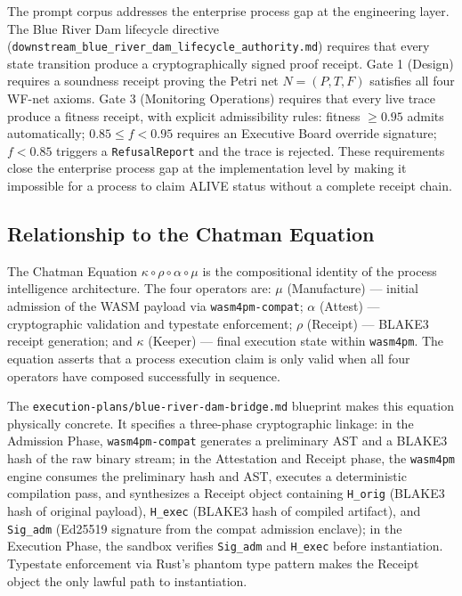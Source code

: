 The prompt corpus addresses the enterprise process gap at the engineering layer. The
Blue River Dam lifecycle directive (\texttt{downstream\_blue\_river\_dam\_lifecycle\_authority.md})
requires that every state transition produce a cryptographically signed proof receipt.
Gate 1 (Design) requires a soundness receipt proving the Petri net $N = (P, T, F)$
satisfies all four WF-net axioms. Gate 3 (Monitoring Operations) requires that every
live trace produce a fitness receipt, with explicit admissibility rules:
fitness $\geq 0.95$ admits automatically; $0.85 \leq f < 0.95$ requires an Executive
Board override signature; $f < 0.85$ triggers a \texttt{RefusalReport} and the trace
is rejected. These requirements close the enterprise process gap at the implementation
level by making it impossible for a process to claim ALIVE status without a complete
receipt chain.

\subsection{Relationship to the Chatman Equation}
\label{sec:prompts-lineage-chatman}

The Chatman Equation $\kappa \circ \rho \circ \alpha \circ \mu$ is the compositional
identity of the process intelligence architecture. The four operators are:
$\mu$ (Manufacture) --- initial admission of the WASM payload via
\texttt{wasm4pm-compat}; $\alpha$ (Attest) --- cryptographic validation and typestate
enforcement; $\rho$ (Receipt) --- BLAKE3 receipt generation; and $\kappa$ (Keeper)
--- final execution state within \texttt{wasm4pm}. The equation asserts that a
process execution claim is only valid when all four operators have composed
successfully in sequence.

The \texttt{execution-plans/blue-river-dam-bridge.md} blueprint makes this equation
physically concrete. It specifies a three-phase cryptographic linkage: in the
Admission Phase, \texttt{wasm4pm-compat} generates a preliminary AST and a BLAKE3
hash of the raw binary stream; in the Attestation and Receipt phase, the
\texttt{wasm4pm} engine consumes the preliminary hash and AST, executes a
deterministic compilation pass, and synthesizes a Receipt object containing
\texttt{H\_orig} (BLAKE3 hash of original payload), \texttt{H\_exec} (BLAKE3 hash
of compiled artifact), and \texttt{Sig\_adm} (Ed25519 signature from the compat
admission enclave); in the Execution Phase, the sandbox verifies \texttt{Sig\_adm}
and \texttt{H\_exec} before instantiation. Typestate enforcement via Rust's phantom
type pattern makes the Receipt object the only lawful path to instantiation.

